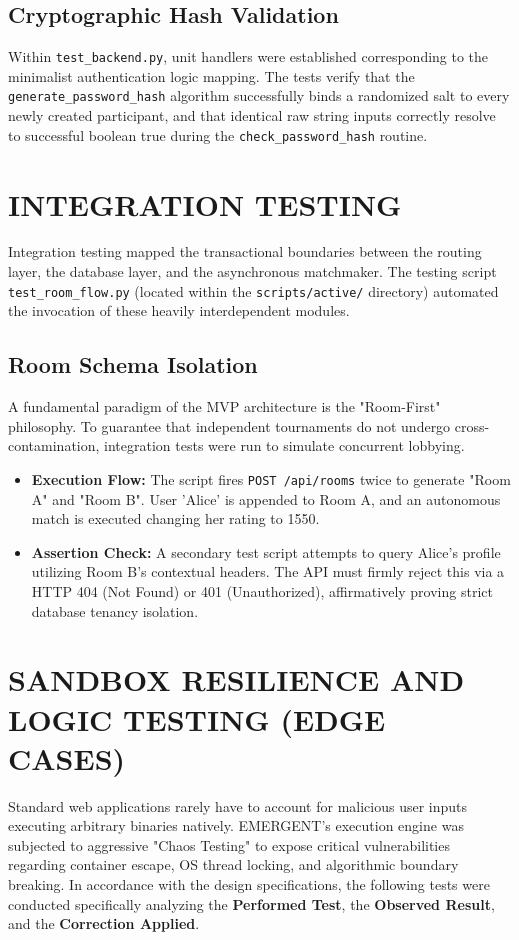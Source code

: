 \documentclass[12pt,a4paper]{report}
\begin{document}
\subsection{Cryptographic Hash Validation}
Within \texttt{test\_backend.py}, unit handlers were established corresponding to the minimalist authentication logic mapping. The tests verify that the 
\texttt{generate\_password\_hash} algorithm successfully binds a randomized salt to every newly created participant, and that identical raw string inputs correctly resolve to successful boolean true during the 
\texttt{check\_password\_hash} routine.

\section{INTEGRATION TESTING}
Integration testing mapped the transactional boundaries between the routing layer, the database layer, and the asynchronous matchmaker. The testing script \texttt{test\_room\_flow.py} (located within the \texttt{scripts/active/} directory) automated the invocation of these heavily interdependent modules.

\subsection{Room Schema Isolation}
A fundamental paradigm of the MVP architecture is the "Room-First" philosophy. To guarantee that independent tournaments do not undergo cross-contamination, integration tests were run to simulate concurrent lobbying.
\begin{itemize}
    \item \textbf{Execution Flow:} The script fires \texttt{POST /api/rooms} twice to generate "Room A" and "Room B". User 'Alice' is appended to Room A, and an autonomous match is executed changing her rating to 1550.
    \item \textbf{Assertion Check:} A secondary test script attempts to query Alice's profile utilizing Room B's contextual headers. The API must firmly reject this via a HTTP 404 (Not Found) or 401 (Unauthorized), affirmatively proving strict database tenancy isolation.
\end{itemize}

\section{SANDBOX RESILIENCE AND LOGIC TESTING (EDGE CASES)}
Standard web applications rarely have to account for malicious user inputs executing arbitrary binaries natively. EMERGENT’s execution engine was subjected to aggressive "Chaos Testing" to expose critical vulnerabilities regarding container escape, OS thread locking, and algorithmic boundary breaking. In accordance with the design specifications, the following tests were conducted specifically analyzing the \textbf{Performed Test}, the \textbf{Observed Result}, and the \textbf{Correction Applied}.
\end{document}

